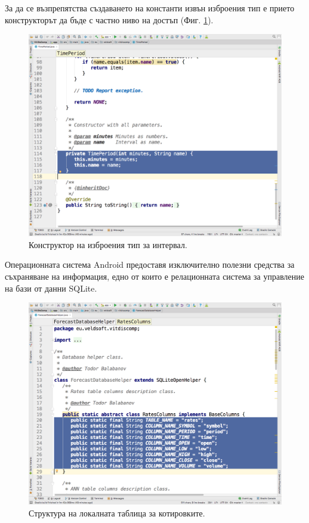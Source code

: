 \documentclass[book,14pt,oneside,openany]{memoir}
\begin{document}
За да се възпрепятства създаването на константи извън изброения тип е прието конструкторът да бъде с частно ниво на достъп (Фиг. \ref{fig:pic0083}).

\begin{figure}[h]
  \centering
  \includegraphics[height=0.45\pdfpageheight]{pic0083}
  \caption{Конструктор на изброения тип за интервал.}
\label{fig:pic0083}
\end{figure}
\FloatBarrier

Операционната система Android предоставя изключително полезни средства за съхраняване на информация, едно от които е релационната система за управление на бази от данни SQLite. 

\begin{figure}[h]
  \centering
  \includegraphics[height=0.45\pdfpageheight]{pic0084}
  \caption{Структура на локалната таблица за котировките.}
\label{fig:pic0084}
\end{figure}
\FloatBarrier
\end{document}
